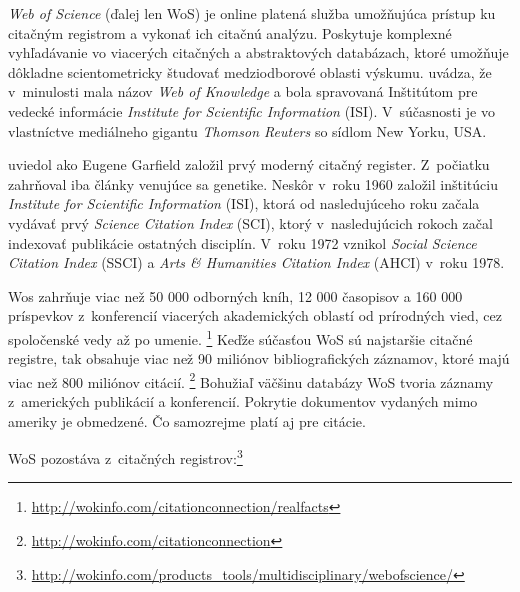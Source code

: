\emph{Web of Science} (ďalej len WoS) je online platená služba umožňujúca prístup ku
citačným registrom a vykonať ich citačnú analýzu.  Poskytuje komplexné vyhľadávanie vo
viacerých citačných a abstraktových databázach, ktoré umožňuje dôkladne
scientometricky študovať medziodborové oblasti výskumu. \citet{Drake2005}
uvádza, že v~minulosti mala názov \emph{Web of Knowledge} a bola spravovaná
Inštitútom pre vedecké informácie \emph{Institute for Scientific Information}
(ISI).  V~súčasnosti je vo vlastníctve mediálneho gigantu \emph{Thomson Reuters}
so sídlom New Yorku, USA.

\citet{Smith2012} uviedol ako Eugene Garfield založil prvý moderný citačný
register.  Z~počiatku zahrňoval iba články venujúce sa genetike.  Neskôr v~roku
1960 založil inštitúciu \emph{Institute for Scientific Information} (ISI),
ktorá od nasledujúceho roku začala vydávať prvý  \emph{Science Citation Index} (SCI), ktorý v~nasledujúcich rokoch začal
indexovať publikácie ostatných disciplín.  V~roku 1972 vznikol  \emph{Social Science Citation Index} (SSCI) a
 \emph{Arts \& Humanities
Citation Index} (AHCI) v~roku 1978.

Wos zahrňuje viac než 50 000 odborných kníh, 12 000 časopisov a 160 000
príspevkov z~konferencií viacerých akademických oblastí od prírodných vied, cez
spoločenské vedy až po umenie.
\footnote{\url{http://wokinfo.com/citationconnection/realfacts}} Keďže súčasťou
WoS sú najstaršie citačné registre, tak obsahuje viac než 90 miliónov
bibliografických záznamov, ktoré majú viac než 800 miliónov citácií.
\footnote{\url{http://wokinfo.com/citationconnection}} Bohužiaľ väčšinu
databázy WoS tvoria záznamy z~amerických publikácií a konferencií. Pokrytie
dokumentov vydaných mimo ameriky je obmedzené.  Čo samozrejme platí aj pre
citácie.

WoS pozostáva z~citačných registrov:\footnote{\url{http://wokinfo.com/products_tools/multidisciplinary/webofscience/}}

